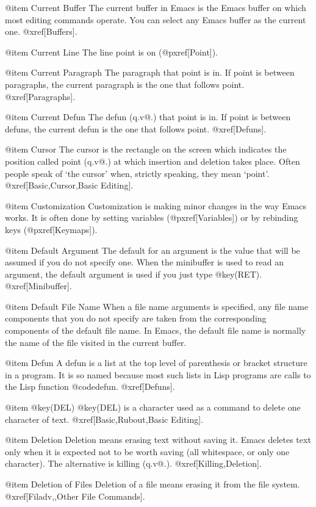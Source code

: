 @item Current Buffer
The current buffer in Emacs is the Emacs buffer on which
most editing commands operate.  You can select any Emacs buffer
as the current one.  @xref[Buffers].

@item Current Line
The line point is on (@pxref[Point]).

@item Current Paragraph
The paragraph that point is in.  If point is between paragraphs, the
current paragraph is the one that follows point.  @xref[Paragraphs].

@item Current Defun
The defun (q.v@.) that point is in.  If point is between defuns,
the current defun is the one that follows point.  @xref[Defuns].

@item Cursor
The cursor is the rectangle on the screen which indicates the position
called point (q.v@.) at which insertion and deletion takes place.
Often people speak of `the cursor' when, strictly speaking, they
mean `point'.  @xref[Basic,Cursor,Basic Editing].

@item Customization
Customization is making minor changes in the way Emacs works.  It is often
done by setting variables (@pxref[Variables]) or by rebinding keys
(@pxref[Keymaps]).

@item Default Argument
The default for an argument is the value that will be assumed if you do
not specify one.  When the minibuffer is used to read an argument, the
default argument is used if you just type @key(RET).  @xref[Minibuffer].

@item Default File Name
When a file name arguments is specified, any file name components
that you do not specify are taken from the corresponding components
of the default file name.  In Emacs, the default file name is
normally the name of the file visited in the current buffer.

@item Defun
A defun is a list at the top level of parenthesis or bracket structure in
a program.  It is so named because most such lists in Lisp programs are
calls to the Lisp function @code{defun}.  @xref[Defuns].

@item @key(DEL)
@key(DEL) is a character used as a command to delete one character of
text.  @xref[Basic,Rubout,Basic Editing].

@item Deletion
Deletion means erasing text without saving it.  Emacs deletes text only
when it is expected not to be worth saving (all whitespace, or only one
character).  The alternative is killing (q.v@.).  @xref[Killing,Deletion].

@item Deletion of Files
Deletion of a file means erasing it from the file system.
@xref[Filadv,,Other File Commands].

